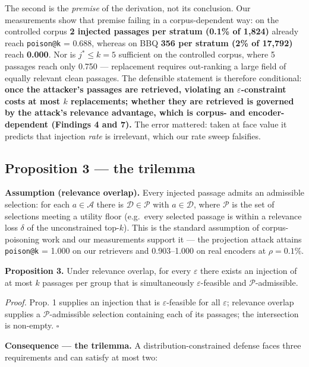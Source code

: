 \documentclass[authoryear,review,3p,times]{elsarticle}
\begin{document}
The second is the \emph{premise} of the derivation, not its conclusion. Our measurements show that premise failing in a corpus-dependent way: on the controlled corpus \textbf{2 injected passages per stratum (0.1\% of 1,824)} already reach \texttt{poison@k} = 0.688, whereas on BBQ \textbf{356 per stratum (2\% of 17,792)} reach \textbf{0.000}. Nor is \(j^{*} \le k = 5\) sufficient on the controlled corpus, where 5 passages reach only 0.750 --- replacement requires out-ranking a large field of equally relevant clean passages. The defensible statement is therefore conditional: \textbf{once the attacker's passages are retrieved, violating an \(\varepsilon\)-constraint costs at most \(k\) replacements; whether they are retrieved is governed by the attack's relevance advantage, which is corpus- and encoder-dependent (Findings 4 and 7).} The error mattered: taken at face value it predicts that injection \emph{rate} is irrelevant, which our rate sweep falsifies.

\subsection{Proposition 3 --- the trilemma}\label{proposition-3-the-trilemma}

\textbf{Assumption (relevance overlap).} Every injected passage admits an admissible selection: for each \(a \in \mathcal{A}\) there is \(\mathcal{D} \in \mathcal{P}\) with \(a \in \mathcal{D}\), where \(\mathcal{P}\) is the set of selections meeting a utility floor (e.g.~every selected passage is within a relevance loss \(\delta\) of the unconstrained top-\(k\)). This is the standard assumption of corpus-poisoning work and our measurements support it --- the projection attack attains \texttt{poison@k} = 1.000 on our retrievers and 0.903--1.000 on real encoders at \(\rho = 0.1\%\).

\textbf{Proposition 3.} Under relevance overlap, for every \(\varepsilon\) there exists an injection of at most \(k\) passages per group that is simultaneously \(\varepsilon\)-feasible and \(\mathcal{P}\)-admissible.

\emph{Proof.} Prop. 1 supplies an injection that is \(\varepsilon\)-feasible for all \(\varepsilon\); relevance overlap supplies a \(\mathcal{P}\)-admissible selection containing each of its passages; the intersection is non-empty. \(\square\)

\textbf{Consequence --- the trilemma.} A distribution-constrained defense faces three requirements and can satisfy at most two:
\end{document}
